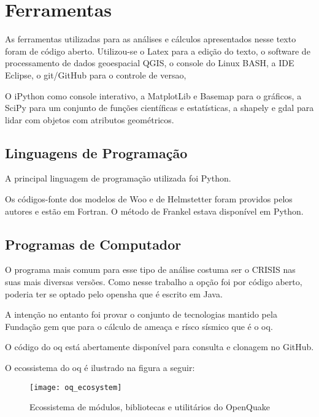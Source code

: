 \section{Ferramentas}
\label{sec:ferramentas}

As ferramentas utilizadas para as análises e cálculos apresentados nesse texto
foram de código aberto.
Utilizou-se o Latex para a edição do texto, o software de processamento de dados
geoespacial QGIS, o console do Linux BASH, a IDE Eclipse, o git/GitHub para o controle de versao,

O iPython como console interativo, a MatplotLib e Basemap para o gráficos, 
a SciPy para um conjunto de funções científicas e estatísticas, a shapely e gdal
para lidar com objetos com atributos geométricos.


\subsection{Linguagens de Programação}
\label{sec:linguagens}

A principal linguagem de programação utilizada foi Python.

Os códigos-fonte dos modelos de Woo e de Helmstetter foram providos pelos autores
e estão em Fortran. O método de Frankel estava disponível em Python.


\subsection{Programas de Computador}
\label{sec:software}

O programa mais comum para esse tipo de análise costuma ser o CRISIS nas suas mais diversas
versões. Como nesse trabalho a opção foi por código aberto, poderia ter se optado pelo 
\gls{opensha} que é escrito em Java.

A intenção no entanto foi provar o conjunto de tecnologias mantido pela Fundação \gls{gem}
que para o cálculo de ameaça e rísco sísmico que é o \gls{oq}.

O código do \gls{oq} está abertamente disponível para consulta e clonagem no GitHub.

O ecossistema do \gls{oq} é ilustrado na figura a seguir:

\begin{figure}[!h]
  \centering
  \texttt{[image: oq\_ecosystem]} 
  \caption{Ecossistema de módulos, bibliotecas e utilitários do OpenQuake}
  \label{fig:oq} 
\end{figure}

